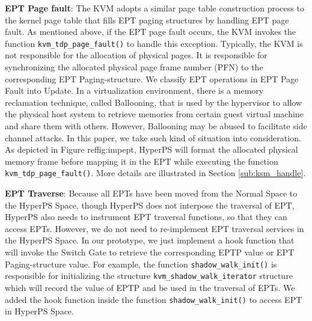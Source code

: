 \textbf{EPT Page fault}:
The KVM adopts a similar page table construction process to the kernel page table that fills EPT paging structures by handling EPT page fault. 
As mentioned above, if the EPT page fault occurs, the KVM invokes the function \verb|kvm_tdp_page_fault()| to handle this exception. 
Typically, the KVM is not responsible for the allocation of physical pages. 
It is responsible for synchronizing the allocated physical page frame number (PFN) to the corresponding EPT Paging-structure. We classify EPT operations in EPT Page Fault into Update. 
In a virtualization environment, there is a memory reclamation technique, called Ballooning, that is used by the hypervisor to allow the physical host system to retrieve memories from certain guest virtual machine and share them with others. 
However, Ballooning may be abused to facilitate side channel attacks. 
In this paper, we take such kind of situation into consideration. As depicted in Figure ref{fig:impept}, 
HyperPS will format the allocated physical memory frame before mapping it in the EPT while executing the function \verb|kvm_tdp_page_fault()|. More details are illustrated in Section \ref{sub:ksm_handle}. 

\textbf{EPT Traverse}: 
Because all EPTs have been moved from the Normal Space to the HyperPS Space, though HyperPS does not interpose the traversal of EPT, HyperPS also needs to instrument EPT traversal functions, so that they can access EPTs. 
However, we do not need to re-implement EPT traversal services in the HyperPS Space. In our prototype, we just implement a hook function that will invoke the Switch Gate to retrieve the corresponding EPTP value or EPT Paging-structure value. 
For example, the function \verb|shadow_walk_init()| is responsible for initializing the structure \verb|kvm_shadow_walk_iterator| structure which will record the value of EPTP and be used in the traversal of EPTs. We added the hook function inside the function \verb|shadow_walk_init()| to access EPT in HyperPS Space. 

